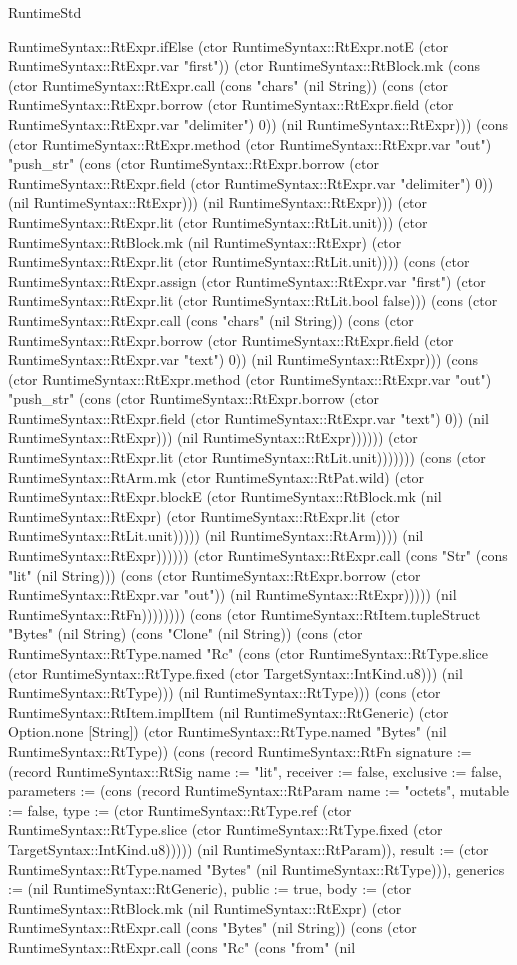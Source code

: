 \begin{lexlean}{RuntimeStd}
\begin{semanticmodule}
{RuntimeSyntax::RtExpr.ifElse (ctor RuntimeSyntax::RtExpr.notE (ctor RuntimeSyntax::RtExpr.var "first")) (ctor RuntimeSyntax::RtBlock.mk (cons (ctor RuntimeSyntax::RtExpr.call (cons "chars" (nil String)) (cons (ctor RuntimeSyntax::RtExpr.borrow (ctor RuntimeSyntax::RtExpr.field (ctor RuntimeSyntax::RtExpr.var "delimiter") 0)) (nil RuntimeSyntax::RtExpr))) (cons (ctor RuntimeSyntax::RtExpr.method (ctor RuntimeSyntax::RtExpr.var "out") "push_str" (cons (ctor RuntimeSyntax::RtExpr.borrow (ctor RuntimeSyntax::RtExpr.field (ctor RuntimeSyntax::RtExpr.var "delimiter") 0)) (nil RuntimeSyntax::RtExpr))) (nil RuntimeSyntax::RtExpr))) (ctor RuntimeSyntax::RtExpr.lit (ctor RuntimeSyntax::RtLit.unit))) (ctor RuntimeSyntax::RtBlock.mk (nil RuntimeSyntax::RtExpr) (ctor RuntimeSyntax::RtExpr.lit (ctor RuntimeSyntax::RtLit.unit)))) (cons (ctor RuntimeSyntax::RtExpr.assign (ctor RuntimeSyntax::RtExpr.var "first") (ctor RuntimeSyntax::RtExpr.lit (ctor RuntimeSyntax::RtLit.bool false))) (cons (ctor RuntimeSyntax::RtExpr.call (cons "chars" (nil String)) (cons (ctor RuntimeSyntax::RtExpr.borrow (ctor RuntimeSyntax::RtExpr.field (ctor RuntimeSyntax::RtExpr.var "text") 0)) (nil RuntimeSyntax::RtExpr))) (cons (ctor RuntimeSyntax::RtExpr.method (ctor RuntimeSyntax::RtExpr.var "out") "push_str" (cons (ctor RuntimeSyntax::RtExpr.borrow (ctor RuntimeSyntax::RtExpr.field (ctor RuntimeSyntax::RtExpr.var "text") 0)) (nil RuntimeSyntax::RtExpr))) (nil RuntimeSyntax::RtExpr)))))) (ctor RuntimeSyntax::RtExpr.lit (ctor RuntimeSyntax::RtLit.unit))))))) (cons (ctor RuntimeSyntax::RtArm.mk (ctor RuntimeSyntax::RtPat.wild) (ctor RuntimeSyntax::RtExpr.blockE (ctor RuntimeSyntax::RtBlock.mk (nil RuntimeSyntax::RtExpr) (ctor RuntimeSyntax::RtExpr.lit (ctor RuntimeSyntax::RtLit.unit))))) (nil RuntimeSyntax::RtArm)))) (nil RuntimeSyntax::RtExpr)))))) (ctor RuntimeSyntax::RtExpr.call (cons "Str" (cons "lit" (nil String))) (cons (ctor RuntimeSyntax::RtExpr.borrow (ctor RuntimeSyntax::RtExpr.var "out")) (nil RuntimeSyntax::RtExpr))))}) (nil RuntimeSyntax::RtFn)))))))) (cons (ctor RuntimeSyntax::RtItem.tupleStruct "Bytes" (nil String) (cons "Clone" (nil String)) (cons (ctor RuntimeSyntax::RtType.named "Rc" (cons (ctor RuntimeSyntax::RtType.slice (ctor RuntimeSyntax::RtType.fixed (ctor TargetSyntax::IntKind.u8))) (nil RuntimeSyntax::RtType))) (nil RuntimeSyntax::RtType))) (cons (ctor RuntimeSyntax::RtItem.implItem (nil RuntimeSyntax::RtGeneric) (ctor Option.none [String]) (ctor RuntimeSyntax::RtType.named "Bytes" (nil RuntimeSyntax::RtType)) (cons (record RuntimeSyntax::RtFn {signature := (record RuntimeSyntax::RtSig {name := "lit", receiver := false, exclusive := false, parameters := (cons (record RuntimeSyntax::RtParam {name := "octets", mutable := false, type := (ctor RuntimeSyntax::RtType.ref (ctor RuntimeSyntax::RtType.slice (ctor RuntimeSyntax::RtType.fixed (ctor TargetSyntax::IntKind.u8))))}) (nil RuntimeSyntax::RtParam)), result := (ctor RuntimeSyntax::RtType.named "Bytes" (nil RuntimeSyntax::RtType))}), generics := (nil RuntimeSyntax::RtGeneric), public := true, body := (ctor RuntimeSyntax::RtBlock.mk (nil RuntimeSyntax::RtExpr) (ctor RuntimeSyntax::RtExpr.call (cons "Bytes" (nil String)) (cons (ctor RuntimeSyntax::RtExpr.call (cons "Rc" (cons "from" (nil }
\end{semanticmodule}
\end{lexlean}
